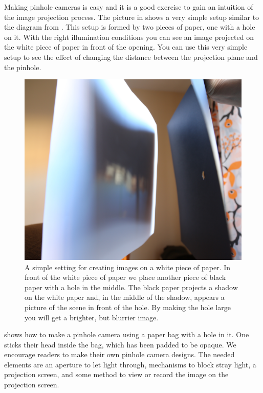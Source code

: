 

Making pinhole cameras is easy and it is a good exercise to gain an intuition of the image projection process. The picture in \fig{\ref{fig:pinhole3}} shows a very simple setup similar to the diagram from . This setup is formed by two pieces of paper, one with a hole on it. With the right illumination conditions you can see an image projected on the white piece of paper in front of the opening. You can use this very simple setup to see the effect of changing the distance between the projection plane and the pinhole.


\begin{figure}[t]
\centerline{
\includegraphics[width=.8\linewidth]{figures/imaging/simple_pinhole.jpg}
}
\caption{A simple setting for creating images on a white piece of paper. In front of the white piece of paper we place another piece of black paper with a hole in the middle. The black paper projects a shadow on the white paper and, in the middle of the shadow, appears a picture of the scene in front of the hole. By making the hole large you will get a brighter, but blurrier image.}
\label{fig:pinhole3}
\end{figure}



\Fig{\ref{fig:pinhole2}} shows how to make a pinhole camera using a paper bag with a hole in it.  One sticks their head inside the bag, which has been padded to be opaque.
We encourage readers to make their own pinhole camera designs. The
needed elements are an aperture to let light through, mechanisms to
block stray light,  a projection screen, and some method to view or
record the image on the projection screen. 


